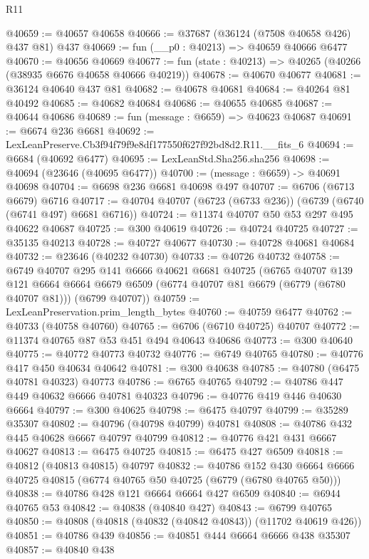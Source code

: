 \begin{lexlean}{R11}
\begin{coremodule}
@40659 := @40657 @40658
@40666 := @37687 (@36124 (@7508 @40658 @426) @437 @81) @437
@40669 := fun (__p0 : @40213) => @40659 @40666 @6477
@40670 := @40656 @40669
@40677 := fun (state : @40213) => @40265 (@40266 (@38935 @6676 @40658 @40666 @40219))
@40678 := @40670 @40677
@40681 := @36124 @40640 @437 @81
@40682 := @40678 @40681
@40684 := @40264 @81 @40492
@40685 := @40682 @40684
@40686 := @40655 @40685
@40687 := @40644 @40686
@40689 := fun (message : @6659) => @40623 @40687
@40691 := @6674 @236 @6681
@40692 := LexLeanPreserve.Cb3f94f79f9e8df177550f627f92bd8d2.R11.__fits_6
@40694 := @6684 (@40692 @6477)
@40695 := LexLeanStd.Sha256.sha256
@40698 := @40694 (@23646 (@40695 @6477))
@40700 := (message : @6659) -> @40691 @40698
@40704 := @6698 @236 @6681 @40698 @497
@40707 := @6706 (@6713 @6679) @6716
@40717 := @40704 @40707 (@6723 (@6733 @236)) (@6739 (@6740 (@6741 @497) @6681 @6716))
@40724 := @11374 @40707 @50 @53 @297 @495 @40622 @40687
@40725 := @300 @40619
@40726 := @40724 @40725
@40727 := @35135 @40213
@40728 := @40727 @40677
@40730 := @40728 @40681 @40684
@40732 := @23646 (@40232 @40730)
@40733 := @40726 @40732
@40758 := @6749
    @40707
    @295
    @141
    @6666
    @40621
    @6681
    @40725
    (@6765
      @40707
      @139
      @121
      @6664
      @6664
      @6679
      @6509
      (@6774 @40707 @81 @6679 (@6779 (@6780 @40707 @81)))
      (@6799 @40707))
@40759 := LexLeanPreservation.prim_length_bytes
@40760 := @40759 @6477
@40762 := @40733 (@40758 @40760)
@40765 := @6706 (@6710 @40725) @40707
@40772 := @11374 @40765 @87 @53 @451 @494 @40643 @40686
@40773 := @300 @40640
@40775 := @40772 @40773 @40732
@40776 := @6749 @40765
@40780 := @40776 @417 @450 @40634 @40642
@40781 := @300 @40638
@40785 := @40780 (@6475 @40781 @40323) @40773
@40786 := @6765 @40765
@40792 := @40786 @447 @449 @40632 @6666 @40781 @40323
@40796 := @40776 @419 @446 @40630 @6664
@40797 := @300 @40625
@40798 := @6475 @40797
@40799 := @35289 @35307
@40802 := @40796 (@40798 @40799) @40781
@40808 := @40786 @432 @445 @40628 @6667 @40797 @40799
@40812 := @40776 @421 @431 @6667 @40627
@40813 := @6475 @40725
@40815 := @6475 @427 @6509
@40818 := @40812 (@40813 @40815) @40797
@40832 := @40786
    @152
    @430
    @6664
    @6666
    @40725
    @40815
    (@6774 @40765 @50 @40725 (@6779 (@6780 @40765 @50)))
@40838 := @40786 @428 @121 @6664 @6664 @427 @6509
@40840 := @6944 @40765 @53
@40842 := @40838 (@40840 @427)
@40843 := @6799 @40765
@40850 := @40808 (@40818 (@40832 (@40842 @40843)) (@11702 @40619 @426))
@40851 := @40786 @439
@40856 := @40851 @444 @6664 @6666 @438 @35307
@40857 := @40840 @438

\end{coremodule}
\end{lexlean}
